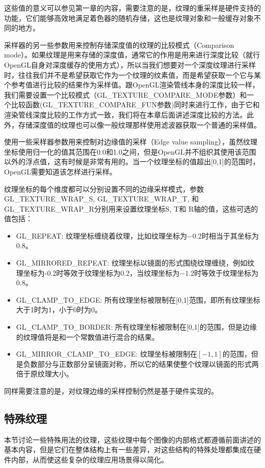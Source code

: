 这些值的意义可以参见第一章的内容，需要注意的是，纹理的重采样是硬件支持的功能，它们能够高效地满足着色器的随机存储，这也是纹理对象和一般缓存对象不同的地方。

采样器的另一些参数用来控制存储深度值的纹理的比较模式（Comparison mode）。如果纹理是用来存储的深度值，通常它的作用是用来进行深度比较（就行OpenGL自身对深度缓存的使用方式），所以当我们想要对一个深度纹理进行采样时，往往我们并不是希望获取它作为一个纹理的纹素值，而是希望获取一个它与某个参考值进行比较的结果作为采样值。跟OpenGL渲染管线本身的深度比较一样，我们需要设置一个比较模式（GL\_TEXTURE\_COMPARE\_MODE参数）和一个比较函数(GL\_TEXTURE\_COMPARE\_FUN参数)同时来进行工作，由于它和渲染管线深度比较的工作方式一致，我们将在本章后面讲述深度比较的方法。此外，存储深度值的纹理也可以像一般纹理那样使用滤波器获取一个普通的采样值。

使用一些采样器参数用来控制对边缘值的采样（Edge value sampling），虽然纹理坐标使用归一化的值其范围在0.0和1.0之间，但是OpenGL并不组织其使用该范围以外的浮点值，这有时候是非常有用的。当一个纹理坐标的值超出[0,1]的范围时，OpenGL需要知道该怎样进行采样。

纹理坐标的每个维度都可以分别设置不同的边缘采样模式，参数GL\_TEXTURE\_WRAP\_S, GL\_TEXTURE\_WRAP\_T, 和 GL\_TEXTURE\_WRAP\_R分别用来设置纹理坐标S, T和 R轴的值，这些可选的值包括：

\begin{itemize}
	\item GL\_REPEAT: 纹理坐标缠绕着纹理，比如纹理坐标为$-0.2$时相当于其坐标为0.8。	
	\item GL\_MIRRORED\_REPEAT: 纹理坐标以镜面的形式围绕纹理缠绕，例如纹理坐标为-0.2时等效于纹理坐标为0.2，当纹理坐标为$-1.2$时等效于纹理坐标为0.8。
	\item GL\_CLAMP\_TO\_EDGE: 所有纹理坐标被限制在[0,1]范围，即所有纹理坐标大于1时为1，小于0时为0。
	\item GL\_CLAMP\_TO\_BORDER: 所有纹理坐标被限制在[0,1]的范围，但是边缘的纹理值将是和一个常数值进行混合的结果。
	\item GL\_MIRROR\_CLAMP\_TO\_EDGE: 纹理坐标被限制在$[-1,1]$的范围，但是负数部分与正数部分呈镜面对称，所以它的结果使整个纹理以镜面的形式两倍于原纹理大小。
\end{itemize}

同样需要注意的是，对纹理边缘的采样控制仍然是基于硬件实现的。





\subsection{特殊纹理}
本节讨论一些特殊用法的纹理，这些纹理中每个图像的内部格式都遵循前面讲述的基本内容，但是它们在整体结构上有一些差异，对这些结构的特殊处理都集成在硬件内部，从而使这些复杂的纹理应用场景得以简化。

